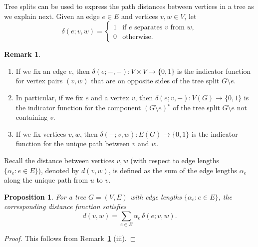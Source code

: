 \documentclass[12pt]{amsart}
\newtheorem{prop}[thm]{Proposition}
\theoremstyle{definition}
\newtheorem{rmk}[thm]{Remark}
\begin{document}
Tree splits can be used to express the path distances between vertices in a tree as we explain next.
Given an edge $e\in E$ and vertices $v,w \in V$, let 
\begin{equation}
\delta(e;v,w) = \begin{cases}
	1 &\text{if $e$ separates  $v$ from $w$}, \\
	0 &\text{otherwise}.
\end{cases}
\end{equation}

\begin{rmk}\label{rmk:delta-properties}
\hfill
\begin{enumerate}[label=(\roman*)]
\item If we fix an edge $e$, then $\delta(e; -, -): V \times V \to \{0, 1\}$ is the indicator function for vertex pairs $(v, w)$ that are on opposite sides of the tree split $G \setminus e$.

\item 
In particular, if we fix $e$ and a vertex $v$,
then $\delta(e;v, -) \colon V(G) \to \{0,1\}$ 
is the indicator function for the component 
$(G \setminus e)^{\overline v}$ of the tree split $G \setminus e$ not containing $v$.

\item If we fix vertices $v, w$, then $\delta(-;v,w) \colon E(G) \to \{0,1\}$
is the indicator function for the unique path between $v$ and $w$.
\end{enumerate}
\end{rmk}

Recall the distance between vertices $v,w$ (with respect to edge lengths $\{ \alpha_e \colon e \in E\}$), denoted by $d(v,w)$, is defined as the sum of the edge lengths $\alpha_e$ along the unique path from $u$ to $v$. 

\begin{prop}
\label{prop:distance-sum}
For a tree $G = (V,E)$ with edge lengths $\{\alpha_e \colon e \in E\}$, the corresponding distance function satisfies
\[ 
	d(v,w) = \sum_{e \in E} \alpha_e \, \delta(e; v,w) .
\]
\end{prop}
\begin{proof}
This follows from Remark~\ref{rmk:delta-properties} (iii).
\end{proof}
\end{document}

